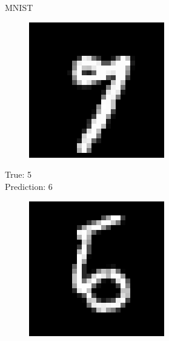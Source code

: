 \documentclass{beamer}
\begin{document}
\begin{frame}{MNIST}
\begin{minipage}[t]{0.32\columnwidth}
\begin{figure}
			\includegraphics[width=1\columnwidth]{pres_pics/high_conf/97}
		\end{figure}
	\end{minipage}
	\begin{minipage}[t]{0.32\columnwidth}
		True: 5\\
		Prediction: 6
		\begin{figure}
			\includegraphics[width=1\columnwidth]{pres_pics/high_conf/56}
		\end{figure}
	\end{minipage}
\end{frame}
\end{document}
